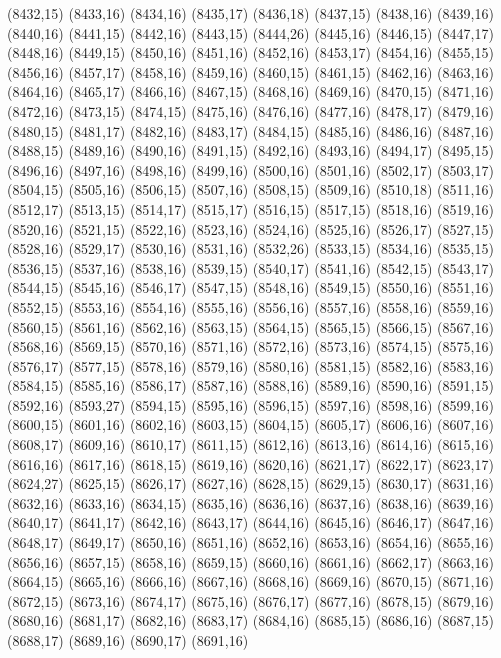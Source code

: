 (8432,15)
(8433,16)
(8434,16)
(8435,17)
(8436,18)
(8437,15)
(8438,16)
(8439,16)
(8440,16)
(8441,15)
(8442,16)
(8443,15)
(8444,26)
(8445,16)
(8446,15)
(8447,17)
(8448,16)
(8449,15)
(8450,16)
(8451,16)
(8452,16)
(8453,17)
(8454,16)
(8455,15)
(8456,16)
(8457,17)
(8458,16)
(8459,16)
(8460,15)
(8461,15)
(8462,16)
(8463,16)
(8464,16)
(8465,17)
(8466,16)
(8467,15)
(8468,16)
(8469,16)
(8470,15)
(8471,16)
(8472,16)
(8473,15)
(8474,15)
(8475,16)
(8476,16)
(8477,16)
(8478,17)
(8479,16)
(8480,15)
(8481,17)
(8482,16)
(8483,17)
(8484,15)
(8485,16)
(8486,16)
(8487,16)
(8488,15)
(8489,16)
(8490,16)
(8491,15)
(8492,16)
(8493,16)
(8494,17)
(8495,15)
(8496,16)
(8497,16)
(8498,16)
(8499,16)
(8500,16)
(8501,16)
(8502,17)
(8503,17)
(8504,15)
(8505,16)
(8506,15)
(8507,16)
(8508,15)
(8509,16)
(8510,18)
(8511,16)
(8512,17)
(8513,15)
(8514,17)
(8515,17)
(8516,15)
(8517,15)
(8518,16)
(8519,16)
(8520,16)
(8521,15)
(8522,16)
(8523,16)
(8524,16)
(8525,16)
(8526,17)
(8527,15)
(8528,16)
(8529,17)
(8530,16)
(8531,16)
(8532,26)
(8533,15)
(8534,16)
(8535,15)
(8536,15)
(8537,16)
(8538,16)
(8539,15)
(8540,17)
(8541,16)
(8542,15)
(8543,17)
(8544,15)
(8545,16)
(8546,17)
(8547,15)
(8548,16)
(8549,15)
(8550,16)
(8551,16)
(8552,15)
(8553,16)
(8554,16)
(8555,16)
(8556,16)
(8557,16)
(8558,16)
(8559,16)
(8560,15)
(8561,16)
(8562,16)
(8563,15)
(8564,15)
(8565,15)
(8566,15)
(8567,16)
(8568,16)
(8569,15)
(8570,16)
(8571,16)
(8572,16)
(8573,16)
(8574,15)
(8575,16)
(8576,17)
(8577,15)
(8578,16)
(8579,16)
(8580,16)
(8581,15)
(8582,16)
(8583,16)
(8584,15)
(8585,16)
(8586,17)
(8587,16)
(8588,16)
(8589,16)
(8590,16)
(8591,15)
(8592,16)
(8593,27)
(8594,15)
(8595,16)
(8596,15)
(8597,16)
(8598,16)
(8599,16)
(8600,15)
(8601,16)
(8602,16)
(8603,15)
(8604,15)
(8605,17)
(8606,16)
(8607,16)
(8608,17)
(8609,16)
(8610,17)
(8611,15)
(8612,16)
(8613,16)
(8614,16)
(8615,16)
(8616,16)
(8617,16)
(8618,15)
(8619,16)
(8620,16)
(8621,17)
(8622,17)
(8623,17)
(8624,27)
(8625,15)
(8626,17)
(8627,16)
(8628,15)
(8629,15)
(8630,17)
(8631,16)
(8632,16)
(8633,16)
(8634,15)
(8635,16)
(8636,16)
(8637,16)
(8638,16)
(8639,16)
(8640,17)
(8641,17)
(8642,16)
(8643,17)
(8644,16)
(8645,16)
(8646,17)
(8647,16)
(8648,17)
(8649,17)
(8650,16)
(8651,16)
(8652,16)
(8653,16)
(8654,16)
(8655,16)
(8656,16)
(8657,15)
(8658,16)
(8659,15)
(8660,16)
(8661,16)
(8662,17)
(8663,16)
(8664,15)
(8665,16)
(8666,16)
(8667,16)
(8668,16)
(8669,16)
(8670,15)
(8671,16)
(8672,15)
(8673,16)
(8674,17)
(8675,16)
(8676,17)
(8677,16)
(8678,15)
(8679,16)
(8680,16)
(8681,17)
(8682,16)
(8683,17)
(8684,16)
(8685,15)
(8686,16)
(8687,15)
(8688,17)
(8689,16)
(8690,17)
(8691,16)
